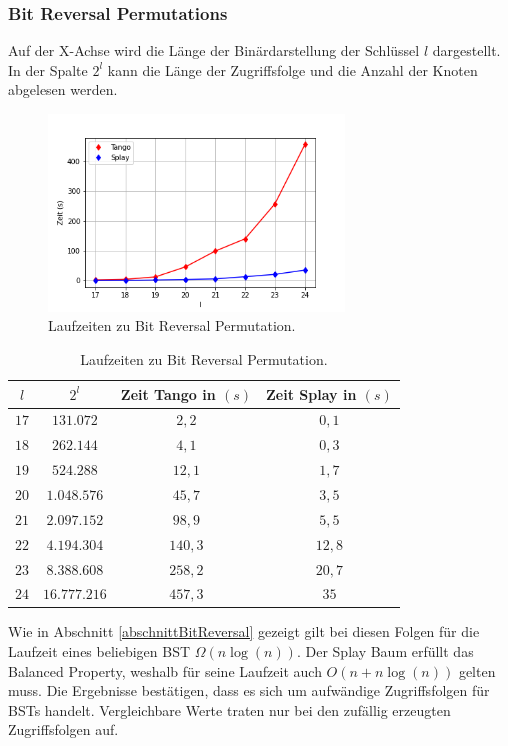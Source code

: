 \documentclass[a4paper,12pt]{article}
\begin{document}
\subsubsection{Bit Reversal Permutations}
Auf der X-Achse wird die Länge der Binärdarstellung der Schlüssel $l$ dargestellt. In der Spalte $2^l$ kann die Länge der Zugriffsfolge und die Anzahl der Knoten abgelesen werden. 
\begin{figure}[H]
	\centering
	\includegraphics[width=0.7\textwidth]{Medien/laufzeittest/diagramm/brp}
	\caption{Laufzeiten zu Bit Reversal Permutation.}
	\label{fig:ResultGUI}
\end{figure}
\begin{table}[H]
	\begin{center}
		\begin{tabular}[c]{|c|c|c|c|}
			\hline
			$l$ & $2^l$ &Zeit Tango in $\left(s\right)$ &Zeit Splay in $\left(s\right)$ \\
			\hline
			$17$ &	$131.072 $ &$2,2$ &$0,1$ \\
			\hline
			$18$  &$262.144 $ &$4,1$ &$0,3$  \\
			\hline
			$19$  &$524.288 $ &$12,1$ &$1,7$  \\
			\hline
			$20$  &$1.048.576 $ &$45,7$ &$3,5$  \\
			\hline
			$21$  &$2.097.152 $ &$98,9$ &$5,5$  \\
			\hline
			$22$  &$4.194.304 $ &$140,3$ &$12,8$  \\
			\hline
			$23$  &$8.388.608 $ &$258,2$ &$20,7$  \\
			\hline
			$24$  &$16.777.216$ &$457,3$ &$35$  \\
			\hline
		\end{tabular}
		\caption{Laufzeiten zu Bit Reversal Permutation.} 
	\end{center}
\end{table}
\noindent Wie in Abschnitt \ref{abschnittBitReversal} gezeigt gilt bei diesen Folgen für die Laufzeit eines beliebigen BST $\Omega \left(n \log\left(n\right)\right)$. Der Splay Baum erfüllt das Balanced Property, weshalb für seine Laufzeit auch $O\left(n + n \log\left(n\right)\right)$ gelten muss. Die Ergebnisse bestätigen, dass es sich um aufwändige Zugriffsfolgen für BSTs handelt. Vergleichbare Werte traten nur bei den zufällig erzeugten Zugriffsfolgen auf. \\
\end{document}
